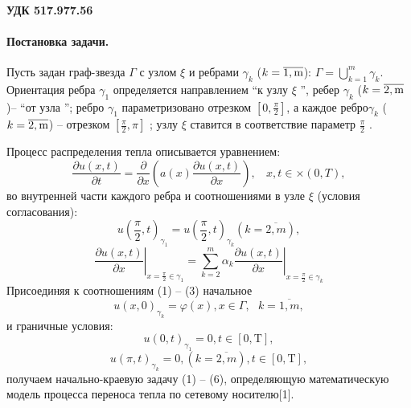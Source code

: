 \paragraph{УДК 517.977.56 }
\vzmscaption
\paragraph{Постановка задачи.}
Пусть задан граф-звезда $\Gamma$ с узлом $\xi$ и ребрами $\gamma_k$ ($k=\overline{\rm 1,m}$): $\Gamma=\bigcup\limits_{k=1}^{m}{{{\gamma }_{k}}}$. Ориентация ребра $\gamma_1$ определяется направлением “к узлу $\xi$ ”, ребер $\gamma_k$ ($k=\overline{\rm 2,m}$)– “от узла ”; ребро $\gamma_1$ параметризовано отрезком $[0,\frac{\pi}{2}] $, а каждое ребро$\gamma_k$ ($k=\overline{\rm 2,m}$) – отрезком $[\frac{\pi}{2},\pi] $ ; узлу $\xi$ ставится в соответствие параметр $\frac{\pi}{2}$ .

Процесс распределения тепла описывается уравнением:
\begin{equation}\label{tran_eq1}
	\frac{\partial u(x,t)}{\partial t}=\frac{\partial }{\partial x}\left( a(x)\frac{\partial u(x,t)}{\partial x} \right),\,\,\,\,~x,t\in \times (0,T),
\end{equation}
во внутренней части каждого ребра и соотношениями в узле $\xi $ (условия согласования):
\begin{equation}\label{tran_eq2}
	u{{\left( \frac{\pi }{2},t \right)}_{{{\gamma }_{1}}}}=u{{\left( \frac{\pi }{2},t \right)}_{{{\gamma }_{k}}}}(k=\overline{2,m}),
\end{equation}
\begin{equation}\label{tran_eq3}
	{{\left. \frac{\partial u(x,t)}{\partial x} \right|}_{x=\frac{\pi }{2}\in {{\gamma }_{1}}}}={{\sum\limits_{k=2}^{m}{{{\alpha }_{k}}\left. \frac{\partial u(x,t)}{\partial x} \right|}}_{x=\frac{\pi }{2}\in {{\gamma }_{k}}}}
\end{equation}
Присоединяя к соотношениям (1) – (3) начальное 
\begin{equation}\label{tran_eq4}
u{{(x,0)}_{{{\gamma }_{k}}}}=\varphi (x), x\in \Gamma ,\,\,\,\,k=\overline{1,m},
\end{equation}
и граничные условия:
\begin{equation}\label{tran_eq5}
u{{(0,t)}_{{{\gamma }_{1}}}}=0,t\in \left[ 0,\text{T} \right],
\end{equation}
\begin{equation}\label{tran_eq6}
u{{(\pi ,t)}_{{{\gamma }_{k}}}}=0,(k=\overline{2,m}), t\in \left[ 0,\text{T} \right],
\end{equation}
получаем начально-краевую задачу (1) – (6), определяющую математическую модель процесса переноса тепла по сетевому носителю[1].
